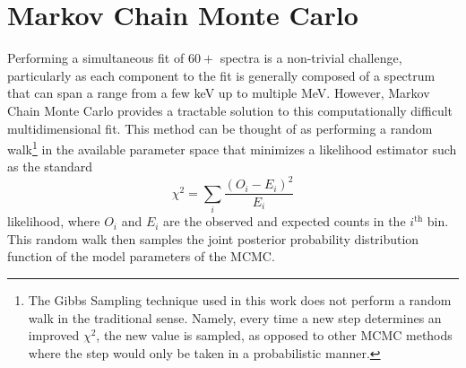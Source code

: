 \section{Markov Chain Monte Carlo}
\label{sec:MCMC}
Performing a simultaneous fit of $60+$ spectra is a non-trivial challenge, particularly as each component to the fit is generally composed of a spectrum that can span a range from a few keV up to multiple MeV. 
However, Markov Chain Monte Carlo provides a tractable solution to this computationally difficult multidimensional fit.
This method can be thought of as performing a random walk\footnote{The Gibbs Sampling technique used in this work does not perform a random walk in the traditional sense.
Namely, every time a new step determines an improved $\chi^2$, the new value is sampled, as opposed to other MCMC methods where the step would only be taken in a probabilistic manner.} in the available parameter space that minimizes a likelihood estimator such as the standard
\begin{equation}
\label{eq:chi_squared}
\chi^2=\sum_i \frac{(O_i-E_i)^2}{E_i}
\end{equation}
likelihood, where $O_i$ and $E_i$ are the observed and expected counts in the $i^{\textrm{th}}$ bin.
This random walk then samples the joint posterior probability distribution function of the model parameters of the MCMC.

